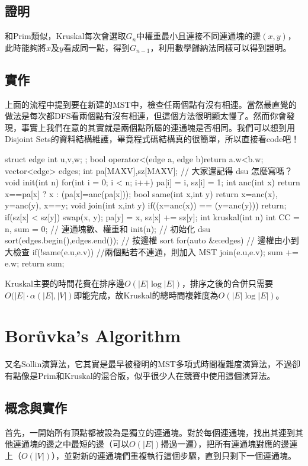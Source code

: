 \documentclass[main.tex]{subfiles}
\begin{document}
\subsection{證明}
和Prim類似，Kruskal每次會選取$G_n$中權重最小且連接不同連通塊的邊$(x, y)$，此時能夠將$x$及$y$看成同一點，得到$G_{n-1}$，利用數學歸納法同樣可以得到證明。
\subsection{實作}
上面的流程中提到要在新建的MST中，檢查任兩個點有沒有相連。當然最直覺的做法是每次都DFS看兩個點有沒有相連，但這個方法很明顯太慢了。然而你會發現，事實上我們在意的其實就是兩個點所屬的連通塊是否相同。我們可以想到用Disjoint Sets的資料結構維護，畢竟程式碼結構真的很簡單，所以直接看code吧！
\begin{C++}
struct edge{
    int u,v,w;
};
bool operator<(edge a, edge b){return a.w<b.w;}
vector<edge> edges;
int pa[MAXV],sz[MAXV]; // 大家還記得 dsu 怎麼寫嗎？
void init(int n) {
    for(int i = 0; i < n; i++) pa[i] = i, sz[i] = 1;
}
int anc(int x){
    return x==pa[x] ? x : (pa[x]=anc(pa[x]));
}
bool same(int x,int y){
    return x=anc(x), y=anc(y), x==y;
}
void join(int x,int y){
    if((x=anc(x)) == (y=anc(y))) return;
    if(sz[x] < sz[y]) swap(x, y);
    pa[y] = x, sz[x] += sz[y];
}
int kruskal(int n){
    int CC = n, sum = 0; // 連通塊數、權重和
    init(n); // 初始化 dsu
    sort(edges.begin(),edges.end()); // 按邊權 sort
    for(auto &e:edges) { // 邊權由小到大檢查
    	if(!same(e.u,e.v)) {//兩個點若不連通，則加入 MST
    		join(e.u,e.v);
    		sum += e.w;
    	}
    }
    return sum;
}
\end{C++}
Kruskal主要的時間花費在排序邊$O(|E|\log|E|)$，排序之後的合併只需要$O(|E|\cdot\alpha(|E|,|V|)$即能完成，故Kruskal的總時間複雜度為$O(|E|\log|E|)$。

\section{Borůvka's Algorithm}
又名Sollin演算法，它其實是最早被發明的MST多項式時間複雜度演算法，不過卻有點像是Prim和Kruskal的混合版，似乎很少人在競賽中使用這個演算法。

\subsection{概念與實作}
首先，一開始所有頂點都被設為是獨立的連通塊。對於每個連通塊，找出其連到其他連通塊的邊之中最短的邊（可以$O(|E|)$掃過一遍），把所有連通塊對應的邊連上（$O(|V|)$），並對新的連通塊們重複執行這個步驟，直到只剩下一個連通塊。
\end{document}
